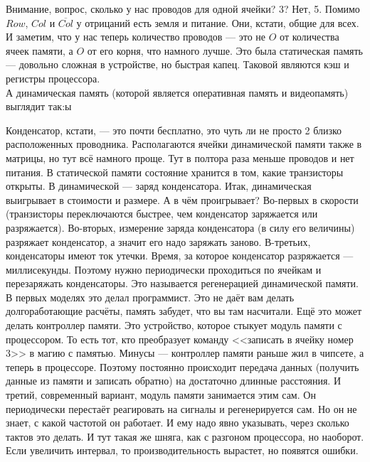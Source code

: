 \documentclass{article}
\begin{document}
    Внимание, вопрос, сколько у нас проводов для одной ячейки? 3? Нет, 5. Помимо $Row$, $Col$ и $\overline{Col}$ у отрицаний есть земля и питание. Они, кстати, общие для всех. И заметим, что у нас теперь количество проводов --- это не $O$ от количества ячеек памяти, а $O$ от его корня, что намного лучше. Это была статическая память --- довольно сложная в устройстве, но быстрая капец. Таковой являются кэш и регистры процессора.\\
    А динамическая память (которой является оперативная память и видеопамять) выглядит так:ы
    \begin{center}
    \end{center}
    Конденсатор, кстати, --- это почти бесплатно, это чуть ли не просто 2 близко расположенных проводника. Располагаются ячейки динамической памяти также в матрицы, но тут всё намного проще. Тут в полтора раза меньше проводов и нет питания. В статической памяти состояние хранится в том, какие транзисторы открыты. В динамической --- заряд конденсатора. Итак, динамическая выигрывает в стоимости и размере. А в чём проигрывает? Во-первых в скорости (транзисторы переключаются быстрее, чем конденсатор заряжается или разряжается). Во-вторых, измерение заряда конденсатора (в силу его величины) разряжает конденсатор, а значит его надо заряжать заново. В-третьих, конденсаторы имеют ток утечки. Время, за которое конденсатор разряжается --- миллисекунды. Поэтому нужно периодически проходиться по ячейкам и перезаряжать конденсаторы. Это называется регенерацией динамической памяти. В первых моделях это делал программист. Это не даёт вам делать долгоработающие расчёты, память забудет, что вы там насчитали. Ещё это может делать контроллер памяти. Это устройство, которое стыкует модуль памяти с процессором. То есть тот, кто преобразует команду <<записать в ячейку номер 3>> в магию с памятью. Минусы --- контроллер памяти раньше жил в чипсете, а теперь в процессоре. Поэтому постоянно происходит передача данных (получить данные из памяти и записать обратно) на достаточно длинные расстояния. И третий, современный вариант, модуль памяти занимается этим сам. Он периодически перестаёт реагировать на сигналы и регенерируется сам. Но он не знает, с какой частотой он работает. И ему надо явно указывать, через сколько тактов это делать. И тут такая же шняга, как с разгоном процессора, но наоборот. Если увеличить интервал, то производительность вырастет, но появятся ошибки.\\
\end{document}
